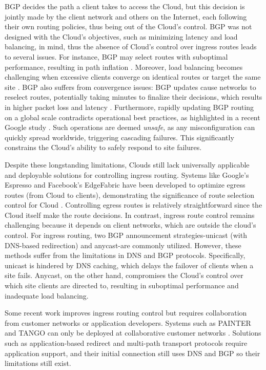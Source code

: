 \documentclass[sigconf,nonacm,screen,letterpaper,10pt]{acmart}
\begin{document}
BGP decides the path a client takes to access the Cloud, but this
decision is jointly made by the client network and others on the
Internet, each following their own routing policies, thus being out of
the Cloud's control. BGP was not designed with the Cloud's objectives,
such as minimizing latency and load balancing, in mind, thus the absence
of Cloud's control over ingress routes leads to several issues. For
instance, BGP may select routes with suboptimal performance, resulting
in path inflation
\cite{painter, anycast_matt, anycast_ppp, imc-jc-deanony, tango}.
Moreover, load balancing becomes challenging when excessive clients
converge on identical routes or target the same site
\cite{tipsy, flavel2015fastroute}. BGP also suffers from convergence
issues: BGP updates cause networks to reselect routes, potentially
taking minutes to finalize their decisions, which results in higher
packet loss and latency
\cite{bgp-conv, a-measurement-study-on-the-impact}. Furthermore, rapidly
updating BGP routing on a global scale contradicts operational best
practices, as highlighted in a recent Google study \cite{capa}. Such
operations are deemed \emph{unsafe}, as any misconfiguration can quickly
spread worldwide, triggering cascading failures. This significantly
constrains the Cloud's ability to safely respond to site failures.

Despite these longstanding limitations, Clouds still lack universally
applicable and deployable solutions for controlling ingress routing.
Systems like Google's Espresso and Facebook's EdgeFabric have been
developed to optimize egress routes (from Cloud to clients),
demonstrating the significance of route selection control for Cloud
\cite{yap2017taking, schlinker2017engineering}. Controlling egress
routes is relatively straightforward since the Cloud itself make the
route decisions. In contrast, ingress route control remains challenging
because it depends on client networks, which are outside the cloud's
control. For ingress routing, two BGP announcement strategies-unicast
(with DNS-based redirection) and anycast-are commonly utilized. However,
these methods suffer from the limitations in DNS and BGP protocols.
Specifically, unicast is hindered by DNS caching, which delays the
failover of clients when a site fails. Anycast, on the other hand,
compromises the Cloud's control over which site clients are directed to,
resulting in suboptimal performance and inadequate load balancing.

Some recent work improves ingress routing control but requires
collaboration from customer networks or application developers. Systems
such as PAINTER and TANGO can only be deployed at collaborative customer
networks \cite{painter,tango-nsdi}. Solutions such as application-based
redirect and multi-path transport protocols require application support,
and their initial connection still uses DNS and BGP so their limitations
still exist.
\end{document}
